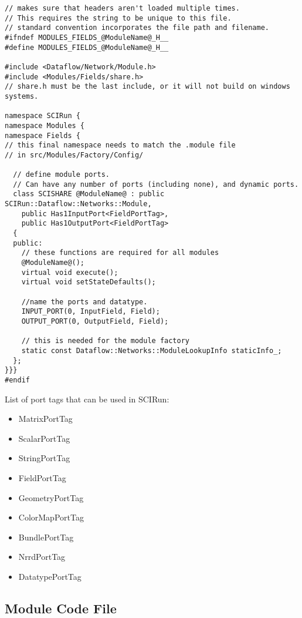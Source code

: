 \documentclass[fleqn,11pt,openany]{book}
\begin{document}
\begin{verbatim}
// makes sure that headers aren't loaded multiple times. 
// This requires the string to be unique to this file.
// standard convention incorporates the file path and filename.
#ifndef MODULES_FIELDS_@ModuleName@_H__
#define MODULES_FIELDS_@ModuleName@_H__

#include <Dataflow/Network/Module.h>
#include <Modules/Fields/share.h>
// share.h must be the last include, or it will not build on windows systems.

namespace SCIRun {
namespace Modules {
namespace Fields {
// this final namespace needs to match the .module file
// in src/Modules/Factory/Config/
  
  // define module ports.  
  // Can have any number of ports (including none), and dynamic ports.
  class SCISHARE @ModuleName@ : public SCIRun::Dataflow::Networks::Module,
    public Has1InputPort<FieldPortTag>,
    public Has1OutputPort<FieldPortTag>
  {
  public:
    // these functions are required for all modules
    @ModuleName@();
    virtual void execute();
    virtual void setStateDefaults();
    
    //name the ports and datatype.
    INPUT_PORT(0, InputField, Field);
    OUTPUT_PORT(0, OutputField, Field);
  
    // this is needed for the module factory
    static const Dataflow::Networks::ModuleLookupInfo staticInfo_;
  };
}}}
#endif
\end{verbatim}


List of port tags that can be used in SCIRun:
\begin{itemize}
\item MatrixPortTag 
\item ScalarPortTag
\item StringPortTag
\item FieldPortTag
\item GeometryPortTag
\item ColorMapPortTag
\item BundlePortTag
\item NrrdPortTag
\item DatatypePortTag
\end{itemize}

\subsection{Module Code File}
\end{document}
